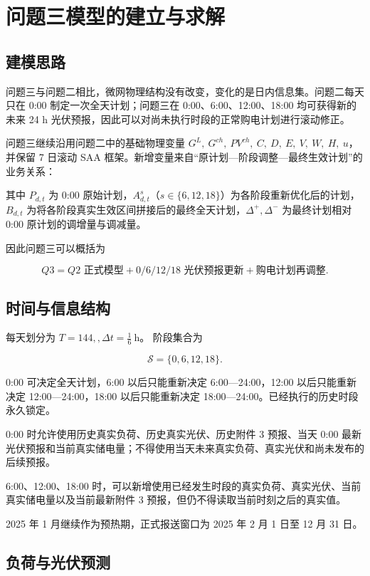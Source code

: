 \section{问题三模型的建立与求解}

\subsection{建模思路}

问题三与问题二相比，微网物理结构没有改变，变化的是日内信息集。问题二每天只在 0:00 制定一次全天计划；问题三在 0:00、6:00、12:00、18:00 均可获得新的未来 24 h 光伏预报，因此可以对尚未执行时段的正常购电计划进行滚动修正。

问题三继续沿用问题二中的基础物理变量 \(G^L,\ G^{ch},\ PV^{ch},\ C,\ D,\ E,\ V,\ W,\ H,\ u\)， 并保留 7 日滚动 SAA 框架。新增变量来自“原计划—阶段调整—最终生效计划”的业务关系：

\noindent 其中 \(P_{d,t}\) 为 0:00 原始计划，\(A^s_{d,t}\)（\(s\in\{6,12,18\}\)）为各阶段重新优化后的计划，\(B_{d,t}\) 为将各阶段真实生效区间拼接后的最终全天计划，\(\Delta^+,\Delta^-\) 为最终计划相对 0:00 原计划的调增量与调减量。

因此问题三可以概括为

\[
\boxed{
Q3
=
Q2\text{ 正式模型}
+
0/6/12/18\text{ 光伏预报更新}
+
\text{购电计划再调整}
}.
\]

\subsection{时间与信息结构}

每天划分为 \(T=144,, \Delta t=\frac16\ \mathrm{h}\)。 阶段集合为

\[
\mathcal S=\{0,6,12,18\}.
\]

0:00 可决定全天计划，6:00 以后只能重新决定 6:00—24:00，12:00 以后只能重新决定 12:00—24:00，18:00 以后只能重新决定 18:00—24:00。已经执行的历史时段永久锁定。

0:00 时允许使用历史真实负荷、历史真实光伏、历史附件 3 预报、当天 0:00 最新光伏预报和当前真实储电量；不得使用当天未来真实负荷、真实光伏和尚未发布的后续预报。

6:00、12:00、18:00 时，可以新增使用已经发生时段的真实负荷、真实光伏、当前真实储电量以及当前最新附件 3 预报，但仍不得读取当前时刻之后的真实值。

2025 年 1 月继续作为预热期，正式报送窗口为 2025 年 2 月 1 日至 12 月 31 日。

\subsection{负荷与光伏预测}

